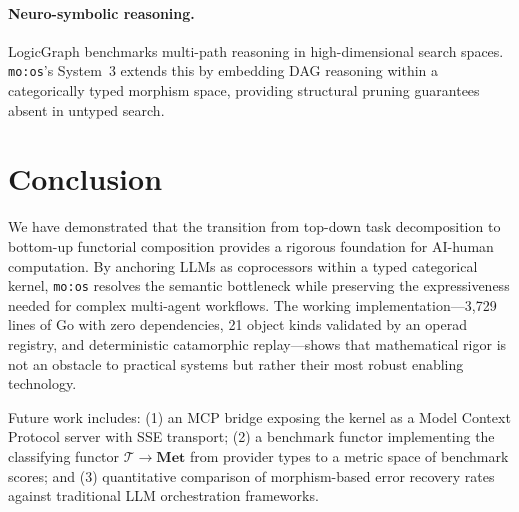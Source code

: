 \documentclass[submission,copyright,creativecommons]{eptcs}
\begin{document}
\paragraph{Neuro-symbolic reasoning.}
LogicGraph \cite{logicgraph2025} benchmarks multi-path reasoning in
high-dimensional search spaces. \texttt{mo:os}'s System~3 extends this by
embedding DAG reasoning within a categorically typed morphism space, providing
structural pruning guarantees absent in untyped search.

\section{Conclusion}
\label{sec:conclusion}

We have demonstrated that the transition from top-down task decomposition to
bottom-up functorial composition provides a rigorous foundation for
AI-human computation. By anchoring LLMs as coprocessors within a typed
categorical kernel, \texttt{mo:os} resolves the semantic bottleneck while
preserving the expressiveness needed for complex multi-agent workflows. The
working implementation---3{,}729 lines of Go with zero dependencies, 21 object
kinds validated by an operad registry, and deterministic catamorphic
replay---shows that mathematical rigor is not an obstacle to practical systems
but rather their most robust enabling technology.

Future work includes: (1) an MCP bridge \cite{mcp2024} exposing the kernel as
a Model Context Protocol server with SSE transport; (2) a benchmark functor
implementing the classifying functor $\mathcal{T} \to \mathbf{Met}$ from
provider types to a metric space of benchmark scores; and (3) quantitative
comparison of morphism-based error recovery rates against traditional LLM
orchestration frameworks.



\end{document}
